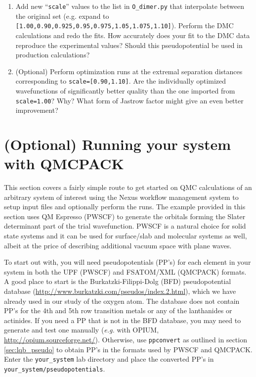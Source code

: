 \begin{enumerate}
  \item{Add new ``\texttt{scale}'' values to the list in \texttt{O\_dimer.py} that interpolate between the original set (e.g. expand to \texttt{[1.00,0.90,0.925,0.95,0.975,1.05,1.075,1.10]}).  Perform the DMC calculations and redo the fits.  How accurately does your fit to the DMC data reproduce the experimental values?  Should this pseudopotential be used in production calculations?}

  \item{(Optional) Perform optimization runs at the extremal separation distances corresponding to \texttt{scale=[0.90,1.10]}}.  Are the individually optimized wavefunctions of significantly better quality than the one imported from \texttt{scale=1.00}?  Why?  What form of Jastrow factor might give an even better improvement? 
\end{enumerate}




\section{(Optional) Running your system with QMCPACK}\label{sec:your_system}
This section covers a fairly simple route to get started on QMC calculations of an arbitrary system of interest using the Nexus workflow management system to setup input files and optionally perform the runs.  The example provided in this section uses QM Espresso (PWSCF) to generate the orbitals forming the Slater determinant part of the trial wavefunction.  PWSCF is a natural choice for solid state systems and it can be used for surface/slab and molecular systems as well, albeit at the price of describing additional vacuum space with plane waves.

To start out with, you will need pseudopotentials (PP's) for each element in your system in both the UPF (PWSCF) and FSATOM/XML (QMCPACK) formats.  A good place to start is the Burkatzki-Filippi-Dolg (BFD) pseudopotential database \newline (\href{http://www.burkatzki.com/pseudos/index.2.html}{http://www.burkatzki.com/pseudos/index.2.html}), which we have already used in our study of the oxygen atom.  The database does not contain PP's for the 4th and 5th row transition metals or any of the lanthanides or actinides.  If you need a PP that is not in the BFD database, you may need to generate and test one manually (\emph{e.g.} with OPIUM, \href{http://opium.sourceforge.net/}{http://opium.sourceforge.net/}).  Otherwise, use \texttt{ppconvert} as outlined in section \ref{sec:lqb_pseudo} to obtain PP's in the formats used by PWSCF and QMCPACK.  Enter the \texttt{your\_system} lab directory and place the converted PP's in \texttt{your\_system/pseudopotentials}.

